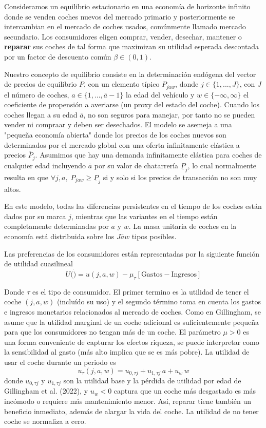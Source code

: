 \documentclass{article}
\begin{document}
Consideramos un equilibrio estacionario en una economía de horizonte infinito donde se venden coches nuevos del mercado primario y posteriormente se intercambian en el mercado de coches usados, comúnmente llamado mercado secundario. Los consumidores eligen comprar, vender, desechar, mantener o \textbf{reparar} sus coches de tal forma que maximizan su utilidad esperada descontada por un factor de descuento común $\beta\in (0,1)$.

Nuestro concepto de equilibrio consiste en la determinación endógena del vector de precios de equilibrio $P$, con un elemento típico $P_{jaw}$, donde $j\in\{1,...,J\}$, con $J$ el número de coches, $a\in\{1,...,\bar{a}-1\}$ la edad del vehículo y $w\in\{-\infty, \infty\}$ el coeficiente de propensión a averiarse (un proxy del estado del coche). Cuando los coches llegan a su edad $\bar{a}$, no son seguros para manejar, por tanto no se pueden vender ni compraar y deben ser desechados. El modelo se asemeja a una "pequeña economía abierta" donde los precios de los coches nuevos son determinados por el mercado global con una oferta infinitamente elástica a precios $\overline{P}_{j}$. Asumimos que hay una demanda infinitamente elástica para coches de cualquier edad incluyendo $\bar{a}$ por su valor de chatarrería $\underline{P}_j$, lo cual normalmente resulta en que $\forall j,a,\;P_{jaw}\ge \underline{P}_j$ si y solo si los precios de transacción no son muy altos.

En este modelo, todas las diferencias persistentes en el tiempo de los coches están dados por su marca $j$, mientras que las variantes en el tiempo están completamente determinadas por $a$ y $w$. La masa unitaria de coches en la economía está distribuida sobre los $J\bar{a}w$ tipos posibles. 

Las preferencias de los consumidores están representadas por la siguiente función de utilidad cuasilineal
$$U(\dot)=u(j,a,w)-\mu_{\tau}[\text{Gastos} - \text{Ingresos}]$$

Donde $\tau$ es el tipo de consumidor. El primer termino es la utilidad de tener el coche $(j,a,w)$ (incluído su uso) y el segundo término toma en cuenta los gastos e ingresos monetarios relacionados al mercado de coches. Como en Gillingham, se asume que la utilidad marginal de un coche adicional es suficientemente pequeña para que los consumidores no tengan más de un coche. El parámetro $\mu>0$ es una forma conveniente de capturar los efectos riqueza, se puede interpretar como la sensibilidad al gasto (más alto implica que se es más pobre). La utilidad de usar el coche durante un periodo es
$$u_\tau(j,a,w)=u_{0,\tau j}+u_{1,\tau j}\,a+u_w\,w$$
donde $u_{0,\tau j}$ y $u_{1,\tau j}$ son la utilidad base y la pérdida de utilidad por edad de Gillingham et al. (2022), y $u_w<0$ captura que un coche más desgastado es más incómodo o requiere más mantenimiento menor. Así, reparar tiene también un beneficio inmediato, además de alargar la vida del coche. La utilidad de no tener coche se normaliza a cero.
\end{document}
